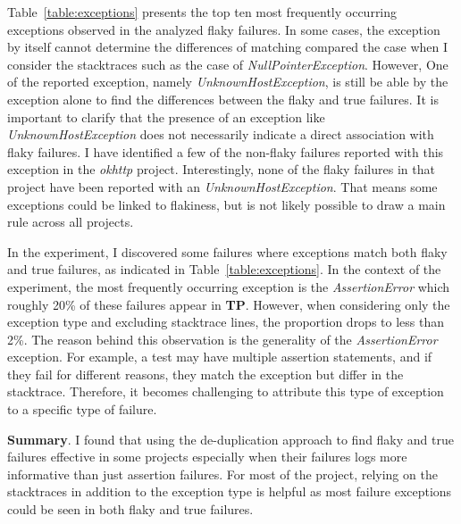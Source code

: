 Table~\ref{table:exceptions} presents the top ten most frequently occurring exceptions observed in the analyzed flaky failures. In some cases, the exception by itself cannot determine the differences of matching compared the case when I consider the stacktraces such as the case of \emph{NullPointerException}. However, One of the reported exception, namely \emph{UnknownHostException}, is still be able by the exception alone to find the differences between the flaky and true failures. It is important to clarify that the presence of an exception like \emph{UnknownHostException} does not necessarily indicate a direct association with flaky failures. I have identified a few of the non-flaky failures reported with this exception in the \emph{okhttp} project. Interestingly, none of the flaky failures in that project have been reported with an \emph{UnknownHostException}. That means some exceptions could be linked to flakiness, but is not likely possible to draw a main rule across all projects. 


In the experiment, I discovered some failures where exceptions match both flaky and true failures, as indicated in Table~\ref{table:exceptions}. In the context of the experiment, the most frequently occurring exception is the \emph{AssertionError} which roughly 20\% of these failures appear in \textbf{TP}. However, when considering only the exception type and excluding stacktrace lines, the proportion drops to less than 2\%.
The reason behind this observation is the generality of the \emph{AssertionError} exception. For example, a test may have multiple assertion statements, and if they fail for different reasons, they match the exception but differ in the stacktrace. Therefore, it becomes challenging to attribute this type of exception to a specific type of failure. 



\textbf{Summary}. I found that using the de-duplication approach to find flaky and true failures effective in some projects especially when their failures logs more informative than just assertion failures. For most of the project, relying on the stacktraces in addition to the exception type is helpful as most failure exceptions could be seen in both flaky and true failures.




















